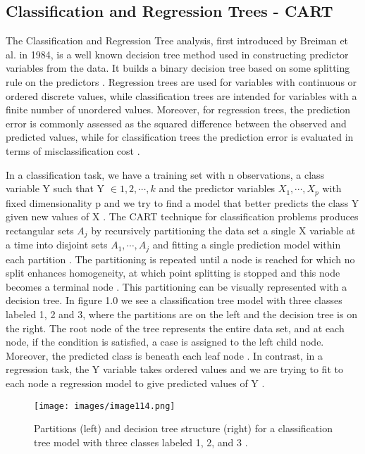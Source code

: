 \documentclass{usiinftr}
\begin{document}
\subsection{Classification and Regression Trees - CART}
The Classification and Regression Tree analysis, first introduced by Breiman et al. in 1984, is a well known decision tree method used in constructing predictor variables from the data. It builds a binary decision tree based on some splitting rule on the predictors \cite{1}. Regression trees are used for variables with continuous or ordered discrete values, while classification trees are intended for variables with a finite number of unordered values. Moreover, for regression trees, the prediction error is commonly assessed as the squared difference between the observed and predicted values, while for classification trees the prediction error is evaluated in terms of misclassification cost \cite{2}.

In a classification task, we have a training set with n observations, a class variable Y such that Y $\in {1, 2, \cdots, k}$ and the predictor variables $X_1, \cdots ,X_p$ with fixed dimensionality p and we try to find a model that better predicts the class Y given new values of X \cite{1}. The CART technique for classification problems produces rectangular sets $A_j$ by recursively partitioning the data set a single X variable at a time into disjoint sets $A_1,\cdots, A_j$ and fitting a single prediction model within each partition \cite{2}. The partitioning is repeated until a node is reached for which no split enhances homogeneity, at which point splitting is stopped and this node becomes a terminal node \cite{1}. This partitioning can be visually represented with a decision tree. In figure 1.0 we see a classification tree model with three classes labeled 1, 2 and 3, where the partitions are on the left and the decision tree is on the right. The root node of the tree represents the entire data set, and at each node, if the condition is satisfied, a case is assigned to the left child node. Moreover, the predicted class is beneath each leaf node \cite{2}. In contrast, in a regression task, the Y variable takes ordered values and we are trying to fit to each node a regression model to give predicted values of Y \cite{2}.

\begin{figure}[h!] 
\centering
\texttt{[image: images/image114.png]}
\caption{Partitions (left) and decision tree structure (right) for a classification tree model with three classes labeled 1, 2, and 3 \cite{2}.}
\label{VarImp}
\end{figure}
\end{document}
